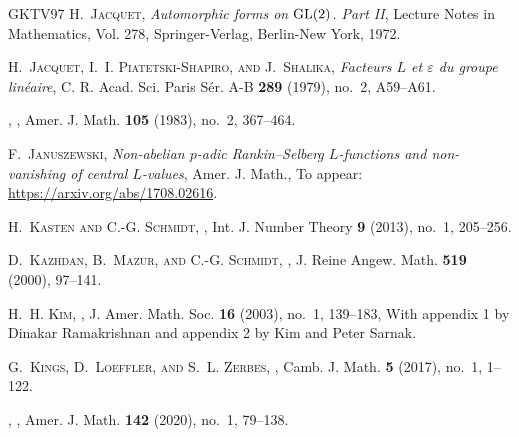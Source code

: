 \documentclass[10pt,reqno,a4paper]{amsart}
\begin{document}
\begin{thebibliography}{GKTV97}
\textsc{H.~Jacquet}, \emph{Automorphic forms on {${\rm GL}(2)$}. {P}art {II}},
  Lecture Notes in Mathematics, Vol. 278, Springer-Verlag, Berlin-New York,
  1972. 

\textsc{H.~Jacquet, I.~I. Piatetski-Shapiro, and J.~Shalika}, \emph{Facteurs
  {$L$} et {$\varepsilon $} du groupe lin\'{e}aire}, C. R. Acad. Sci. Paris
  S\'{e}r. A-B \textbf{289} (1979), no.~2, A59--A61. 

\bysame,
  , Amer. J. Math. \textbf{105} (1983), no.~2, 367--464.

\textsc{F.~Januszewski}, \emph{Non-abelian $p$-adic {R}ankin--{S}elberg
  ${L}$-functions and non-vanishing of central ${L}$-values}, Amer. J. Math.,
  To appear: \url{https://arxiv.org/abs/1708.02616}.

\textsc{H.~Kasten and C.-G. Schmidt},
  , Int. J. Number Theory
  \textbf{9} (2013), no.~1, 205--256. 

\textsc{D.~Kazhdan, B.~Mazur, and C.-G. Schmidt},
  , J. Reine Angew. Math.
  \textbf{519} (2000), 97--141. 

\textsc{H.~H. Kim},
  , J. Amer. Math. Soc. \textbf{16} (2003), no.~1, 139--183, With
  appendix 1 by Dinakar Ramakrishnan and appendix 2 by Kim and Peter Sarnak.

\textsc{G.~Kings, D.~Loeffler, and S.~L. Zerbes},
  , Camb. J. Math. \textbf{5} (2017),
  no.~1, 1--122. 

\bysame,
  , Amer. J. Math. \textbf{142} (2020), no.~1,
  79--138. 


\end{thebibliography}
\end{document}
